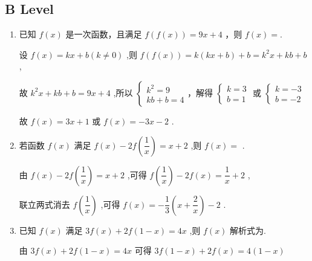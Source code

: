 \subsection*{B Level}
\begin{enumerate}
    \item 已知 $f\left( x\right)$ 是一次函数，且满足 $f\left( {f\left( x\right) }\right)  = {9x} + 4$ ，则 $f\left( x\right) = $.
    \begin{jieda}
        设 $f\left( x\right)  = {kx} + b\left( {k \neq  0}\right)$ ,则 $f\left( {f\left( x\right) }\right)  = k\left( {{kx} + b}\right)  + b = {k}^{2}x + {kb} + b$ ,
        
        故 ${k}^{2}x + {kb} + b = {9x} + 4$ ,所以 $\left\{  \begin{array}{l} {k}^{2} = 9 \\  {kb} + b = 4 \end{array}\right.$，解得 $\left\{  \begin{array}{l} k = 3 \\  b = 1 \end{array}\right.$ 或 $\left\{  \begin{array}{l} k =  - 3 \\  b =  - 2 \end{array}\right.$
        
        故 $f\left( x\right)  = {3x} + 1$ 或 $f\left( x\right)  =  - {3x} - 2$ .
    \end{jieda}
    \item 若函数 $f\left( x\right)$ 满足 $f\left( x\right)  - {2f}\left( \dfrac{1}{x}\right)  = x + 2$ ,则 $f\left( x\right)  =$ .
    \begin{jieda}
        由 $f\left( x\right)  - {2f}\left( \dfrac{1}{x}\right)  = x + 2$ ,可得 $f\left( \dfrac{1}{x}\right)  - {2f}\left( x\right)  = \dfrac{1}{x} + 2$ ,
        
        联立两式消去 $f\left( \dfrac{1}{x}\right)$ ,可得 $f\left( x\right)  =  - \dfrac{1}{3}\left( {x + \dfrac{2}{x}}\right)  - 2$ .
    \end{jieda}
    \item 已知 $f\left( x\right)$ 满足 ${3f}\left( x\right)  + {2f}\left( {1 - x}\right)  = {4x}$ ,则 $f\left( x\right)$ 解析式为.
    \begin{jieda}
        由 ${3f}\left( x\right)  + {2f}\left( {1 - x}\right)  = {4x}$ 可得 ${3f}\left( {1 - x}\right)  + {2f}\left( x\right)  = 4\left( {1 - x}\right)$ 
        

\end{jieda}
\end{enumerate}
